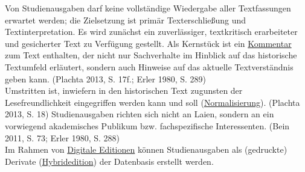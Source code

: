 \documentclass{article}
\begin{document}
        Von Studienausgaben darf keine vollständige Wiedergabe aller Textfassungen erwartet werden; die Zielsetzung ist primär Texterschließung und Textinterpretation. Es wird zunächst ein zuverlässiger, textkritisch erarbeiteter und gesicherter Text zu Verfügung gestellt. Als Kernstück ist ein \href{http://gams.uni-graz.at/o:konde.34}{Kommentar} zum Text enthalten, der nicht nur Sachverhalte im Hinblick auf das historische Textumfeld erläutert, sondern auch Hinweise auf das aktuelle Textverständnis geben kann. (Plachta 2013, S. 17f.; Erler 1980, S. 289)\\
            
        Umstritten ist, inwiefern in den historischen Text zugunsten der Lesefreundlichkeit eingegriffen werden kann und soll (\href{http://gams.uni-graz.at/o:konde.146}{Normalisierung}). (Plachta 2013, S. 18) Studienausgaben richten sich nicht an Laien, sondern an ein vorwiegend akademisches Publikum bzw. fachspezifische Interessenten. (Bein 2011, S. 73; Erler 1980, S. 288)\\
            
        Im Rahmen von \href{http://gams.uni-graz.at/o:konde.59}{Digitale Editionen} können Studienausgaben als (gedruckte) Derivate (\href{http://gams.uni-graz.at/o:konde.96}{Hybridedition}) der Datenbasis erstellt werden.\\
            
\end{document}
